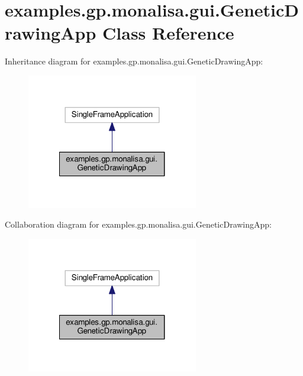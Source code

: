 \hypertarget{classexamples_1_1gp_1_1monalisa_1_1gui_1_1_genetic_drawing_app}{\section{examples.\-gp.\-monalisa.\-gui.\-Genetic\-Drawing\-App Class Reference}
\label{classexamples_1_1gp_1_1monalisa_1_1gui_1_1_genetic_drawing_app}
}


Inheritance diagram for examples.\-gp.\-monalisa.\-gui.\-Genetic\-Drawing\-App\-:
\nopagebreak
\begin{figure}[H]
\begin{center}
\leavevmode
\includegraphics[width=212pt]{classexamples_1_1gp_1_1monalisa_1_1gui_1_1_genetic_drawing_app__inherit__graph}
\end{center}
\end{figure}


Collaboration diagram for examples.\-gp.\-monalisa.\-gui.\-Genetic\-Drawing\-App\-:
\nopagebreak
\begin{figure}[H]
\begin{center}
\leavevmode
\includegraphics[width=212pt]{classexamples_1_1gp_1_1monalisa_1_1gui_1_1_genetic_drawing_app__coll__graph}
\end{center}
\end{figure}
